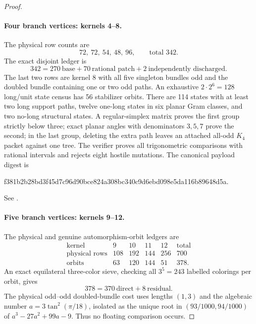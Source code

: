 \documentclass[11pt]{article}
\theoremstyle{remark}
\begin{document}
\begin{proof}
\paragraph{Four branch vertices: kernels 4--8.}
The physical row counts are
\[
 72,\ 72,\ 54,\ 48,\ 96,
 \qquad\text{total }342.
\]
The exact disjoint ledger is
\begin{equation}\label{eq:four-ledger}
 342=270\ \text{base}+70\ \text{rational patch}
       +2\ \text{independently discharged}.
\end{equation}
The last two rows are kernel 8 with all five singleton bundles odd and the
doubled bundle containing one or two odd paths.  An exhaustive
$2\cdot2^6=128$ long/unit state census has 56 stabilizer orbits.  There are
114 states with at least two long support paths, twelve one-long states in six
planar Gram classes, and two no-long structural states.  A regular-simplex
matrix proves the first group strictly below three; exact planar angles with
denominators $3,5,7$ prove the second; in the last group, deleting the extra
path leaves an attached all-odd $K_4$ packet against one tree.  The verifier
proves all trigonometric comparisons with rational intervals and rejects eight
hostile mutations.  The canonical payload digest is
\begin{center}\ttfamily\small
f381b2b28bd3f45d7c96d90bce824a308bc340c9d6ebd098e5da116b89648d5a.
\end{center}
See \cite{FourVertex}.

\paragraph{Five branch vertices: kernels 9--12.}
The physical and genuine automorphism-orbit ledgers are
\[
\begin{array}{c|rrrr|r}
\text{kernel}&9&10&11&12&\text{total}\\ \hline
\text{physical rows}&108&192&144&256&700\\
\text{orbits}&63&120&144&51&378.
\end{array}
\]
An exact equilateral three-color sieve, checking all $3^5=243$ labelled
colorings per orbit, gives
\begin{equation}\label{eq:five-ledger}
 378=370\ \text{direct}+8\ \text{residual}.
\end{equation}
The physical odd--odd doubled-bundle cost uses lengths $(1,3)$ and the
algebraic number $a=3\tan^2(\pi/18)$, isolated as the unique root in
$(93/1000,94/1000)$ of
$a^3-27a^2+99a-9$.  Thus no floating comparison occurs.


\end{proof}
\end{document}
